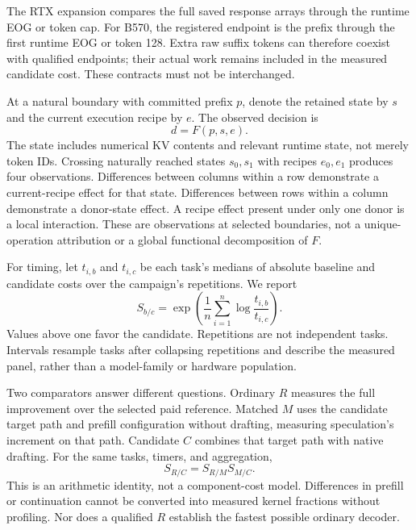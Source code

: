 \documentclass{article}
\begin{document}
The RTX expansion compares the full saved response arrays through the runtime EOG or token cap. For B570, the registered endpoint is the prefix through the first runtime EOG or token 128. Extra raw suffix tokens can therefore coexist with qualified endpoints; their actual work remains included in the measured candidate cost. These contracts must not be interchanged.

At a natural boundary with committed prefix $p$, denote the retained state by $s$ and the current execution recipe by $e$. The observed decision is
\begin{equation}
 d = F(p,s,e).
\end{equation}
The state includes numerical KV contents and relevant runtime state, not merely token IDs. Crossing naturally reached states $s_0,s_1$ with recipes $e_0,e_1$ produces four observations. Differences between columns within a row demonstrate a current-recipe effect for that state. Differences between rows within a column demonstrate a donor-state effect. A recipe effect present under only one donor is a local interaction. These are observations at selected boundaries, not a unique-operation attribution or a global functional decomposition of $F$.

For timing, let $t_{i,b}$ and $t_{i,c}$ be each task's medians of absolute baseline and candidate costs over the campaign's repetitions. We report
\begin{equation}
 S_{b/c}=\exp\left(\frac{1}{n}\sum_{i=1}^{n}\log\frac{t_{i,b}}{t_{i,c}}\right).
\end{equation}
Values above one favor the candidate. Repetitions are not independent tasks. Intervals resample tasks after collapsing repetitions and describe the measured panel, rather than a model-family or hardware population.

Two comparators answer different questions. Ordinary $R$ measures the full improvement over the selected paid reference. Matched $M$ uses the candidate target path and prefill configuration without drafting, measuring speculation's increment on that path. Candidate $C$ combines that target path with native drafting. For the same tasks, timers, and aggregation,
\begin{equation}
 S_{R/C}=S_{R/M}S_{M/C}.
\label{eq:identity}
\end{equation}
This is an arithmetic identity, not a component-cost model. Differences in prefill or continuation cannot be converted into measured kernel fractions without profiling. Nor does a qualified $R$ establish the fastest possible ordinary decoder.
\end{document}
